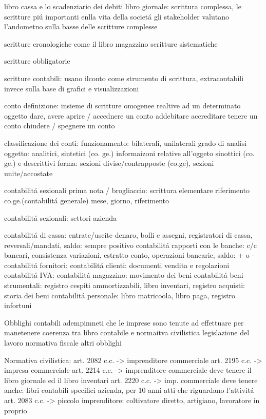 \documentclass{article}
\begin{document}
libro cassa e lo scadenziario dei debiti
libro giornale: scrittura complessa, le scritture pi\'u importanti enlla vita della societ\'a
gli stakeholder valutano l'andometno sulla basse delle scritture complesse

scritture cronologiche come il libro magazzino
scritture sistematiche

scritture obbligatorie

scritture contabili: usano ilconto come strumento di scrittura,
extracontabili invece sulla base di grafici e visualizzazioni

conto
definizione: insieme di scritture omogenee realtive ad un determinato oggetto
dare, avere
aprire / accednere un conto
addebitare
accreditare
tenere un conto
chiudere / spegnere un conto

classificazione dei conti:
funzionamento: bilaterali, unilaterali
grado di analisi oggetto: analitici, sintetici (co. ge.)
informaizoni relative all'oggeto sinottici (co. ge.) e descrittivi
forma: sezioni divise/contrapposte (co.ge), sezioni unite/accostate

contabilit\'a sezionali
prima nota / brogliaccio: scrittura elementare riferimento co.ge.(contabilit\'a generale)
mese, giorno, riferimento

contabilit\'a sezionali: settori azienda

contabilit\'a di cassa: entrate/uscite denaro, bolli e assegni, registratori di cassa, reversali/mandati, saldo: sempre positivo
contabilit\'a rapporti con le banche: c/c bancari, consistenza variazioni, estratto conto, operazioni bancarie, saldo: + o -
contabilit\'a fornitori: 
contabilit\'a clienti: documenti vendita e regolazioni
contabilit\'a IVA: 
contabilit\'a magazzino: movimento dei beni
contabilit\'a beni strumentali: registro cespiti ammortizzabili, libro inventari, registro acquisti: storia dei beni
contabilit\'a personale: libro matricoola, libro paga, registro infortuni

Obblighi contabili
adempimneti che le imprese sono tenute ad effettuare per manetenere coerenza tra libro contabile e 
normaitva civilistica
legislazione del lavoro
normativa fiscale
altri obblighi

Normativa civilistica:
art. 2082 c.c. -> imprenditore commerciale
art. 2195 c.c. -> impresa commerciale
art. 2214 c.c. -> imprenditore commerciale deve tenere il libro giornale ed il libro inventari
art. 2220 c.c. -> imp. commerciale deve tenere anche: libri contabili specifici azienda, per 10 anni atti che riguardano l'attivit\'a
art. 2083 c.c. -> piccolo imprenditore: coltivatore diretto, artigiano, lavoratore in proprio
\end{document}
